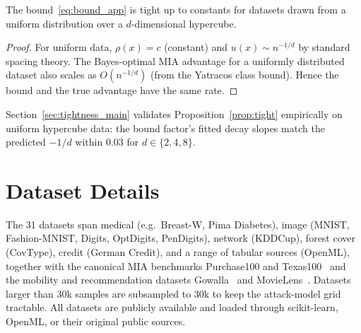 \begin{proposition}[Tightness]
\label{prop:tight}
The bound~\eqref{eq:bound_app} is tight up to constants for datasets
drawn from a uniform distribution over a $d$-dimensional hypercube.
\end{proposition}
\begin{proof}
For uniform data, $\rho(x) = c$ (constant) and $u(x) \sim n^{-1/d}$
by standard spacing theory.
The Bayes-optimal MIA advantage for a uniformly distributed dataset
also scales as $O(n^{-1/d})$ (from the Yatracos class bound).
Hence the bound and the true advantage have the same rate.
\end{proof}

Section~\ref{sec:tightness_main} validates
Proposition~\ref{prop:tight} empirically on uniform hypercube data:
the bound factor's fitted decay slopes match the predicted $-1/d$
within $0.03$ for $d \in \{2,4,8\}$.

\section{Dataset Details}
\label{app:datasets}

The 31 datasets span medical (e.g.\ Breast-W, Pima Diabetes), image (MNIST,
Fashion-MNIST, Digits, OptDigits, PenDigits), network (KDDCup), forest
cover (CovType), credit (German Credit), and a range of tabular sources
(OpenML), together with the canonical MIA benchmarks Purchase100 and
Texas100~\cite{shokri2017membership} and the mobility and recommendation
datasets Gowalla~\cite{cho2011friendship} and
MovieLens~\cite{movielens}.
Datasets larger than 30k samples are subsampled to 30k to keep the
attack-model grid tractable. All datasets are publicly available and loaded
through scikit-learn, OpenML, or their original public sources.
